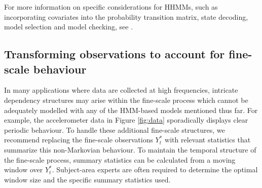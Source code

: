 For more information on specific considerations for HHMMs, such as incorporating covariates into the probability transition matrix, state decoding, model selection and model checking, see \citet{Adam:2019}. 

\subsection{Transforming observations to account for fine-scale behaviour}
\label{subsec:STFT}

In many applications where data are collected at high frequencies, intricate dependency structures may arise within the fine-scale process which cannot be adequately modelled with any of the HMM-based models mentioned thus far. For example, the accelerometer data in Figure \ref{fig:data} sporadically displays clear periodic behaviour. To handle these additional fine-scale structures, we recommend replacing the fine-scale observations $Y_t^*$ with relevant statistics that summarize this non-Markovian behaviour. To maintain the temporal structure of the fine-scale process, summary statistics can be calculated from a moving window over $Y_t^*$. Subject-area experts are often required to determine the optimal window size and the specific summary statistics used. 
%
%

